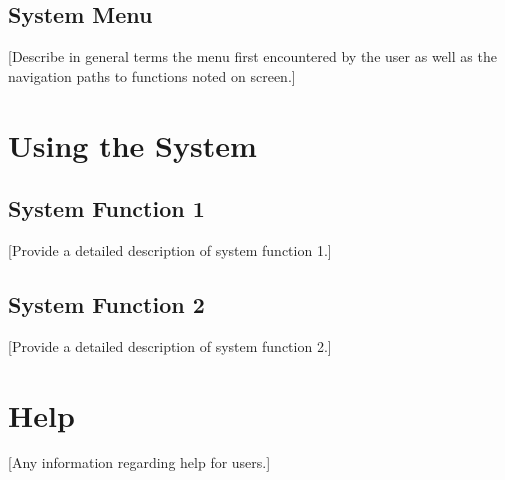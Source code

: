 \documentclass{article}
\begin{document}
    \subsection{System Menu}
    [Describe in general terms the menu first encountered by the user as well as the navigation paths to functions noted on screen.]
  
  \section{Using the System}
    \subsection{System Function 1}
    [Provide a detailed description of system function 1.]
    \subsection{System Function 2}
    [Provide a detailed description of system function 2.]
  
  \section{Help}
    [Any information regarding help for users.]
\end{document}
